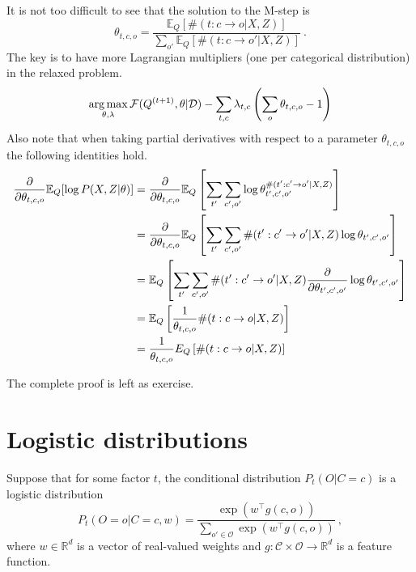 It is not too difficult to see that the solution to the M-step is
\begin{equation}
	\theta_{t, c, o} = \frac{\mathbb E_{Q}[\#(t: c\rightarrow o|X,Z)]}{\sum_{o'} \mathbb E_{Q}[\#(t: c\rightarrow o'|X,Z)]} ~.
\end{equation}
The key is to have more Lagrangian multipliers (one per categorical distribution) in the relaxed problem.
\begin{equation}
\operatorname*{arg\,max}_{\theta, \lambda} \mathcal F(Q^{(t+1)}, \theta|\mathcal D) - \sum_{t, c} \lambda_{t,c} \left( \sum_{o} \theta_{t,c,o} - 1 \right)
\end{equation}
Also note that when taking partial derivatives with respect to a parameter $\theta_{t,c,o}$ the following identities hold.
\begin{subequations}
\begin{align}
	\frac{\partial}{\partial \theta_{t,c,o}} \mathbb E_Q[\log P(X, Z|\theta)] 	
	&= \frac{\partial}{\partial \theta_{t,c,o}} \mathbb E_Q\left[\sum_{t'}\sum_{c',o'} \log \theta_{t',c',o'}^{\#(t':c'\rightarrow o' |X, Z)}\right] \\
	&= \frac{\partial}{\partial \theta_{t,c,o}} \mathbb E_Q\left[\sum_{t'}\sum_{c',o'} \#(t':c'\rightarrow o' |X, Z) \log \theta_{t',c',o'}\right] \\
	&= \mathbb E_Q\left[\sum_{t'}\sum_{c',o'} \#(t':c'\rightarrow o' |X, Z) \frac{\partial}{\partial \theta_{t',c',o'}} \log \theta_{t',c',o'}\right] \\
	&= \mathbb E_Q\left[\frac{1}{\theta_{t,c,o}} \#(t:c\rightarrow o |X, Z) \right] \\
	&= \frac{ 1}{\theta_{t,c,o}} E_Q\left[\#(t:c\rightarrow o |X, Z)\right]
\end{align}
\end{subequations}

The complete proof is left as exercise.


\section{Logistic distributions}

Suppose that for some factor $t$, the conditional distribution $P_t(O|C=c)$ is a logistic distribution
\begin{equation}\label{eq:logistic}
	P_t(O=o|C=c, w) = \frac{\exp(w^\top g(c, o))}{\sum_{o' \in \mathcal O} \exp(w^\top g(c, o))} ~,
\end{equation}
where $w \in \mathbb R^d$ is a vector of real-valued weights and $g: \mathcal C \times \mathcal O \rightarrow \mathbb R^d$ is a feature function.

